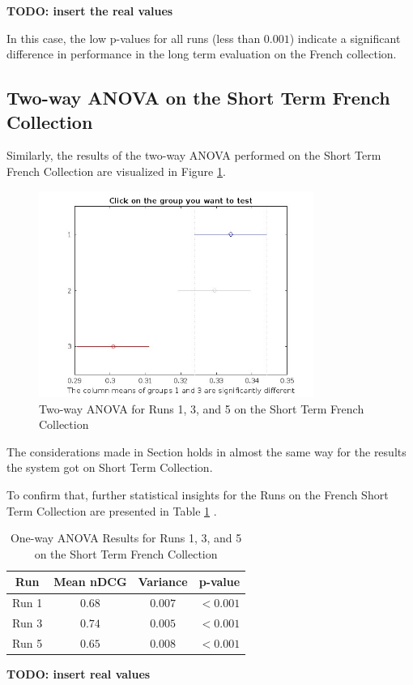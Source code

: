 \begin{center}
    \textbf{TODO: insert the real values}
\end{center}
 
In this case, the low p-values for all runs (less than $0.001$) indicate a significant difference in performance in the long term evaluation on the French collection.

\newpage
\subsection{Two-way ANOVA on the Short Term French Collection}

Similarly, the results of the two-way \ac{ANOVA} performed on the Short Term French Collection are visualized in Figure \ref{fig:st_anova_french}. 

\begin{figure}[!h]
\centering
\includegraphics[width=0.8\textwidth]{figure/StatisticalAnalysis/AnovaTwoWay/ST_FR.jpg}
\caption{Two-way \ac{ANOVA} for Runs 1, 3, and 5 on the Short Term French Collection}
\label{fig:st_anova_french}
\end{figure}

The considerations made in Section \label{sec:anova_fr_lt} holds in almost the same way for the results the system got on Short Term Collection.  

To confirm that, further statistical insights for the Runs on the French Short Term Collection are presented in Table \ref{table:st_anova_french} .

\begin{table}[!h]
\centering
\caption{One-way \ac{ANOVA} Results for Runs 1, 3, and 5 on the Short Term French Collection}
\label{table:st_anova_french}
\begin{tabular}{cccc}
\toprule
\textbf{Run} & \textbf{Mean nDCG} & \textbf{Variance} & \textbf{p-value} \\
\midrule
Run 1 & $0.68$ & $0.007$ & $<0.001$ \\
Run 3 & $0.74$ & $0.005$ & $<0.001$ \\
Run 5 & $0.65$ & $0.008$ & $<0.001$ \\
\bottomrule
\end{tabular}
\end{table}
\begin{center}
    \textbf{TODO: insert real values}
\end{center}

